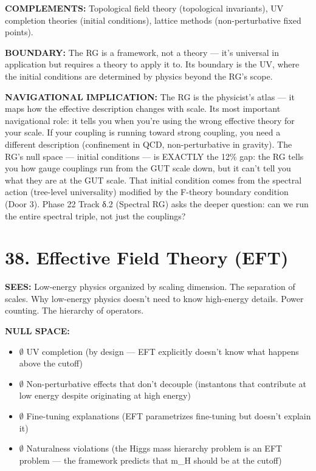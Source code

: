 \textbf{COMPLEMENTS:} Topological field theory (topological invariants), UV completion theories (initial conditions), lattice methods (non-perturbative fixed points).


\textbf{BOUNDARY:} The RG is a framework, not a theory — it's universal in application but requires a theory to apply it to. Its boundary is the UV, where the initial conditions are determined by physics beyond the RG's scope.


\textbf{NAVIGATIONAL IMPLICATION:} The RG is the physicist's atlas — it maps how the effective description changes with scale. Its most important navigational role: it tells you when you're using the wrong effective theory for your scale. If your coupling is running toward strong coupling, you need a different description (confinement in QCD, non-perturbative in gravity). The RG's null space — initial conditions — is EXACTLY the 12\% gap: the RG tells you how gauge couplings run from the GUT scale down, but it can't tell you what they are at the GUT scale. That initial condition comes from the spectral action (tree-level universality) modified by the F-theory boundary condition (Door 3). Phase 22 Track δ.2 (Spectral RG) asks the deeper question: can we run the entire spectral triple, not just the couplings?


\bigskip\noindent\makebox[\textwidth]{\color{rulegray}\rule{5cm}{0.3pt}}\bigskip


\section*{38. Effective Field Theory (EFT)}


\textbf{SEES:} Low-energy physics organized by scaling dimension. The separation of scales. Why low-energy physics doesn't need to know high-energy details. Power counting. The hierarchy of operators.


\textbf{NULL SPACE:}

\begin{itemize}[nosep,leftmargin=*]
  \item $\emptyset$ UV completion (by design — EFT explicitly doesn't know what happens above the cutoff)
  \item $\emptyset$ Non-perturbative effects that don't decouple (instantons that contribute at low energy despite originating at high energy)
  \item $\emptyset$ Fine-tuning explanations (EFT parametrizes fine-tuning but doesn't explain it)
  \item $\emptyset$ Naturalness violations (the Higgs mass hierarchy problem is an EFT problem — the framework predicts that m\_H should be at the cutoff)
\end{itemize}


